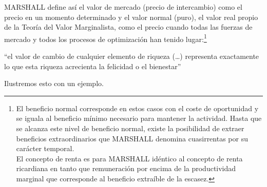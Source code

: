 \documentclass[10pt,a4paper]{article}
\begin{document}
MARSHALL define así el valor de mercado (precio de intercambio) como el precio en un momento determinado y el valor normal (puro), el valor real propio de la Teoría del Valor Marginalista, como el precio cuando todas las fuerzas de mercado y todos los procesos de optimización han tenido lugar:\footnote{%
    El beneficio normal corresponde en estos casos con el coste de oportunidad y se iguala al beneficio mínimo necesario para mantener la actividad. Hasta que se alcanza este nivel de beneficio normal, existe la posibilidad de extraer beneficios extraordinarios que MARSHALL denomina cuasirrentas por su carácter temporal.\\
El concepto de renta es para MARSHALL idéntico al concepto de renta ricardiana en tanto que remuneración por encima de la productividad marginal que corresponde al beneficio extraíble de la escasez.
}

“el valor de cambio de cualquier elemento de riqueza (…) representa exactamente lo que esta riqueza acrecienta la felicidad o el bienestar”

Ilustremos esto con un ejemplo.
\end{document}
